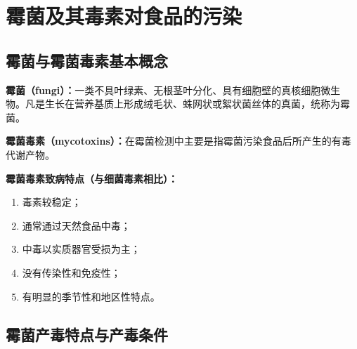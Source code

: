 \section{霉菌及其毒素对食品的污染}

\subsection{霉菌与霉菌毒素基本概念}

\begin{defbox}
\textbf{霉菌（fungi）：}一类不具叶绿素、无根茎叶分化、具有细胞壁的真核细胞微生物。凡是生长在营养基质上形成绒毛状、蛛网状或絮状菌丝体的真菌，统称为霉菌。

\textbf{霉菌毒素（mycotoxins）：}在霉菌检测中主要是指霉菌污染食品后所产生的有毒代谢产物。

\textbf{霉菌毒素致病特点（与细菌毒素相比）：}
\begin{enumerate}[leftmargin=*]
    \item 毒素较稳定；
    \item 通常通过天然食品中毒；
    \item 中毒以实质器官受损为主；
    \item 没有传染性和免疫性；
    \item 有明显的季节性和地区性特点。
\end{enumerate}
\end{defbox}

\subsection{霉菌产毒特点与产毒条件}

